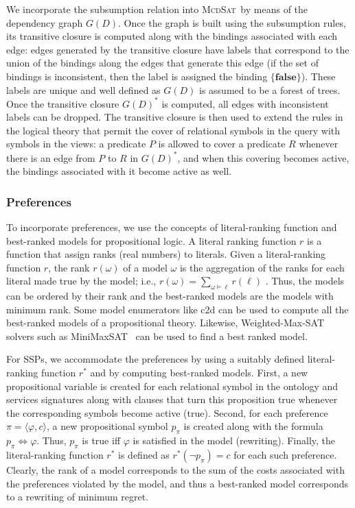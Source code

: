 \documentclass{llncs}
\newcommand{\tup}[1]{\langle #1 \rangle}
\newcommand{\mcdsat}{\textsc{McdSat}}
\begin{document}
We incorporate the subsumption relation into \mcdsat\ by means
of the dependency graph $G(D)$. Once the graph is built using
the subsumption rules, its transitive closure is computed along
with the bindings associated with each edge: edges generated by
the transitive closure have labels that correspond to the union
of the bindings along the edges that generate this edge (if the
set of bindings is inconsistent, then the label is assigned the
binding $\{\textbf{false}\}$).
These labels are unique and well defined as $G(D)$ is assumed
to be a forest of trees. Once the transitive closure $G(D)^*$
is computed, all edges with inconsistent labels can be dropped.
The transitive closure is then used to extend the rules in the
logical theory that permit the cover of relational symbols in
the query with symbols in the views: a predicate $P$ is allowed
to cover a predicate $R$ whenever there is an edge from $P$ to
$R$ in $G(D)^*$, and when this covering becomes active, the 
bindings associated with it become active as well.

\subsubsection{Preferences}

To incorporate preferences, we use the concepts of literal-ranking
function and best-ranked models for propositional logic.
A literal ranking function $r$ is a function that assign ranks
(real numbers) to literals. Given a literal-ranking function $r$,
the rank $r(\omega)$ of a model $\omega$ is the aggregation of the
ranks for each literal made true by the model; i.e.,
$r(\omega)=\sum_{\omega\vDash\ell} r(\ell)$ \cite{darwiche:weighted}.
Thus, the models can be ordered by their rank and the best-ranked
models are the models with minimum rank.
Some model enumerators like c2d can be used to compute all the
best-ranked models of a propositional theory.
Likewise, Weighted-Max-SAT solvers such as MiniMaxSAT~\cite{HerasetalJAIR2008}
can be used to find a best ranked model.

For SSPs, we accommodate the preferences by using a suitably defined
literal-ranking function $r^*$ and by computing best-ranked models.
First, a new propositional variable is created for each relational
symbol in the ontology and services signatures along with clauses
that turn this proposition true whenever the corresponding symbols
become active (true). Second, for each preference $\pi=\tup{\varphi,c}$,
a new propositional symbol $p_\pi$ is created along with the
formula $p_\pi \Leftrightarrow \varphi$. Thus, $p_\pi$ is true
iff $\varphi$ is satisfied in the model (rewriting).
Finally, the literal-ranking function $r^*$ is defined as 
$r^*(\neg p_\pi)=c$ for each such preference.
Clearly, the rank of a model corresponds to the sum of the costs
associated with the preferences violated by the model, and thus
a best-ranked model corresponds to a rewriting of minimum regret.
\end{document}
